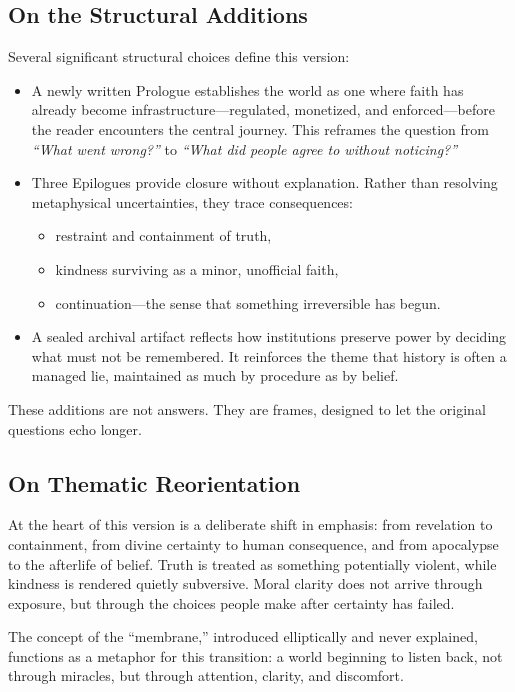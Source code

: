 \subsection*{On the Structural Additions}

Several significant structural choices define this version:

\begin{itemize}
\item A newly written Prologue establishes the world as one where faith has already become infrastructure---regulated, monetized, and enforced---before the reader encounters the central journey. This reframes the question from \emph{``What went wrong?''} to \emph{``What did people agree to without noticing?''}

\item Three Epilogues provide closure without explanation. Rather than resolving metaphysical uncertainties, they trace consequences:
  \begin{itemize}
  \item restraint and containment of truth,
  \item kindness surviving as a minor, unofficial faith,
  \item continuation---the sense that something irreversible has begun.
  \end{itemize}

\item A sealed archival artifact reflects how institutions preserve power by deciding what must not be remembered. It reinforces the theme that history is often a managed lie, maintained as much by procedure as by belief.
\end{itemize}

These additions are not answers. They are frames, designed to let the original questions echo longer.

\subsection*{On Thematic Reorientation}

At the heart of this version is a deliberate shift in emphasis: from revelation to containment, from divine certainty to human consequence, and from apocalypse to the afterlife of belief. Truth is treated as something potentially violent, while kindness is rendered quietly subversive. Moral clarity does not arrive through exposure, but through the choices people make after certainty has failed.

The concept of the ``membrane,'' introduced elliptically and never explained, functions as a metaphor for this transition: a world beginning to listen back, not through miracles, but through attention, clarity, and discomfort.

